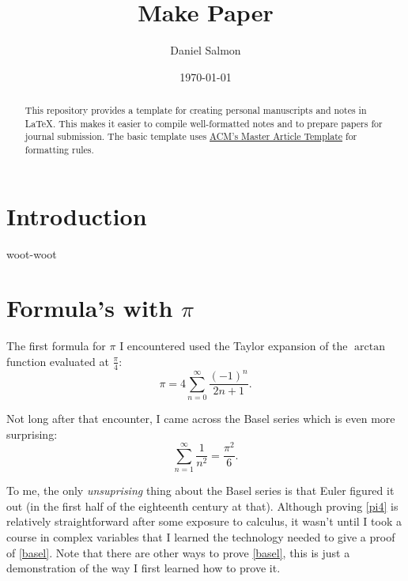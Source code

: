\documentclass[manuscript,screen,nonacm]{acmart}
\begin{document}
\title{Make Paper}

\author{Daniel Salmon}

\date{\today}

\begin{abstract}
This repository provides a template for creating personal manuscripts
and notes in \LaTeX. This makes it easier to compile well-formatted notes and
to prepare papers for journal submission. The basic template uses
\href{https://www.acm.org/publications/proceedings-template}{ACM's Master
Article Template} for formatting rules.
\end{abstract}

\maketitle

\tableofcontents

\clearpage


\section{Introduction}
\label{sec:intro}

woot-woot

\section{Formula's with $\pi$}
\label{sec:formulas-pi}

The first formula for $\pi$ I encountered used the Taylor expansion of the
$\arctan$ function evaluated at $\frac{\pi}{4}$:
\begin{equation}\label{pi4}
	\pi=4\sum_{n=0}^{\infty}\frac{(-1)^{n}}{2n + 1}.
\end{equation}

Not long after that encounter, I came across the Basel series which is even
more surprising:
\begin{equation}\label{basel}
	\sum_{n=1}^{\infty}\frac{1}{n^2}=\frac{\pi^2}{6}.
\end{equation}

To me, the only \emph{unsuprising} thing about the Basel series is that Euler
figured it out (in the first half of the eighteenth century at that). Although
proving \eqref{pi4} is relatively straightforward after some exposure to
calculus, it wasn't until I took a course in complex variables that I learned
the technology needed to give a proof of \eqref{basel}. Note that there are
other ways to prove \eqref{basel}, this is just a demonstration of the way I
first learned how to prove it.
\end{document}
